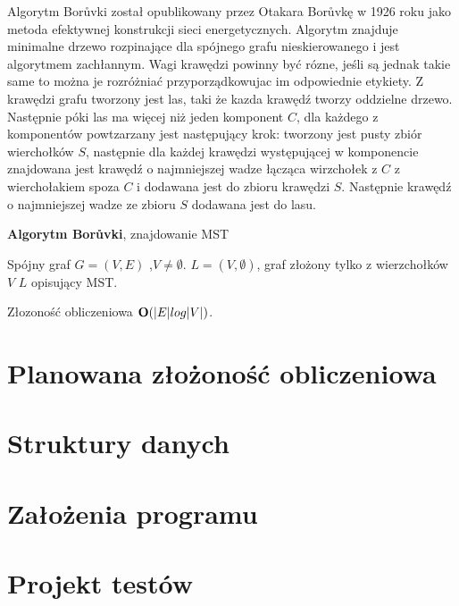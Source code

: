 \documentclass[a4paper, 10pt]{article}
\begin{document}

Algorytm Borůvki został opublikowany przez Otakara Borůvkę w 1926 roku jako metoda efektywnej konstrukcji sieci 
energetycznych. Algorytm znajduje minimalne drzewo rozpinające dla spójnego grafu nieskierowanego i jest algorytmem zachłannym.
Wagi krawędzi powinny być rózne, jeśli są jednak takie same to można je rozróżniać przyporządkowujac im odpowiednie etykiety.
Z krawędzi grafu tworzony jest las, taki że kazda krawędź tworzy oddzielne drzewo. Następnie póki las ma więcej niż jeden komponent $C$, dla każdego
z komponentów powtzarzany jest następujący krok: tworzony jest pusty zbiór wierchołków $S$, następnie dla każdej krawędzi występującej w komponencie znajdowana
jest krawędź o najmniejszej wadze łącząca wirzchołek z $C$ z wierchołakiem spoza $C$ i dodawana jest do zbioru krawędzi $S$. Następnie krawędź o najmniejszej wadze ze zbioru
$S$ dodawana jest do lasu.

	
\begin{algorithm}
\caption{{\bf Algorytm Borůvki}, znajdowanie MST}
\begin{algorithmic}[!h]
\REQUIRE Spójny graf $G=(V,E)$ ,$V \neq \emptyset$. 
\ENSURE $L=(V,\emptyset)$, graf złożony tylko z wierzchołków $V$
\STATE {}
\STATE {}
\ENDFOR 
\ENDWHILE
\RETURN $L$ opisujący MST.
\end{algorithmic}
\end{algorithm}

Złozoność obliczeniowa ${\bf O}(|E| log |V|)$.

\FloatBarrier

\section{Planowana złożoność obliczeniowa}

\section{Struktury danych}
\section{Założenia programu}
\section{Projekt testów}
	
	





\nocite{*}

\end{document}
